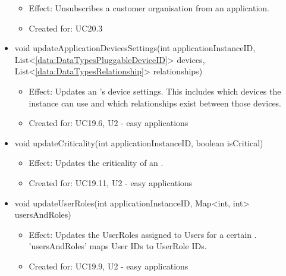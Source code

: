 \begin{description}
\begin{itemize}[noitemsep,nolistsep,leftmargin=-.25cm]
        \begin{itemize}[noitemsep,nolistsep]
           \item Effect: Unsubscribes a customer organisation from an application.
\item Created for: UC20.3
        \end{itemize}
      \item \textsf{void updateApplicationDevicesSettings(int applicationInstanceID, List\textless{}\ref{data:DataTypesPluggableDeviceID}\textgreater{} devices, List\textless{}\ref{data:DataTypesRelationship}\textgreater{} relationships)}
        \begin{itemize}[noitemsep,nolistsep]
           \item Effect: Updates an 's device settings. This includes which devices the instance can use and which relationships exist between those devices.
\item Created for: UC19.6, U2 - easy applications
        \end{itemize}
      \item \textsf{void updateCriticality(int applicationInstanceID, boolean isCritical)}
        \begin{itemize}[noitemsep,nolistsep]
           \item Effect: Updates the criticality of an .
\item Created for: UC19.11, U2 - easy applications
        \end{itemize}
      \item \textsf{void updateUserRoles(int applicationInstanceID, Map\textless{}int, int\textgreater{} usersAndRoles)}
        \begin{itemize}[noitemsep,nolistsep]
           \item Effect: Updates the UserRoles assigned to Users for a certain . 'usersAndRoles' maps User IDs to UserRole IDs.
\item Created for: UC19.9, U2 - easy applications
        \end{itemize}
    \end{itemize}
    \end{description}

